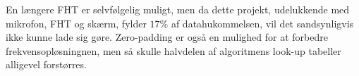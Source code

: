 En længere FHT er selvfølgelig muligt, men da dette projekt, udelukkende med mikrofon, FHT og skærm, fylder $17 \%$ af datahukommelsen, vil det sandsynligvis ikke kunne lade sig gøre. 
Zero-padding er også en mulighed for at forbedre frekvensopløsningnen, men så skulle halvdelen af algoritmens look-up tabeller alligevel forstørres. 
